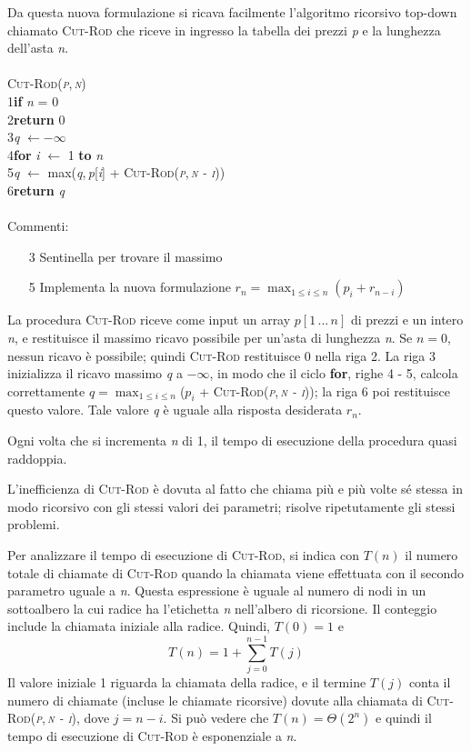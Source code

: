 \documentclass[10pt, a4paper]{report}
\newcommand\firsttab[1][0.5cm]{\hspace*{#1}}
\newcommand\secondtab[1][1cm]{\hspace*{#1}}
\begin{document}
Da questa nuova formulazione si ricava facilmente l'algoritmo ricorsivo top-down chiamato \textsc{Cut-Rod} che riceve in ingresso la tabella dei prezzi \textit{p} e la lunghezza dell'asta \textit{n}.\\\\
\textsc{Cut-Rod(\textit{p},\,\textit{n})}\\
1\firsttab\textbf{if} \textit{n} = 0\\
2\secondtab\textbf{return} 0\\
3\firsttab\textit{q} $\leftarrow -\infty$\\
4\firsttab\textbf{for} \textit{i} $\leftarrow$ 1 \textbf{to} \textit{n}\\
5\secondtab\textit{q} $\leftarrow$ max(\textit{q},\,\textit{p}[\textit{i}] + \textsc{Cut-Rod(\textit{p},\,\textit{n - i})})\\
6\firsttab\textbf{return} \textit{q}\\\\
Commenti:
\begin{enumerate}
\item[3]Sentinella per trovare il massimo
\item[5]Implementa la nuova formulazione $r_n = \max_{1 \leq i \leq n} (p_i + r_{n-i})$
\end{enumerate}
La procedura \textsc{Cut-Rod} riceve come input un array $p[1\,...\,n]$ di prezzi e un intero \textit{n}, e restituisce il massimo ricavo possibile per un'asta di lunghezza \textit{n}. Se $n = 0$, nessun ricavo è possibile; quindi \textsc{Cut-Rod} restituisce 0 nella riga 2. La riga 3 inizializza il ricavo massimo \textit{q} a $-\infty$, in modo che il ciclo \textbf{for}, righe 4 - 5, calcola correttamente $q = \max_{1 \leq i \leq n}$($p_i$ + \textsc{Cut-Rod(\textit{p},\,\textit{n - i})}); la riga 6 poi restituisce questo valore. Tale valore \textit{q} è uguale alla risposta desiderata $r_n$.

Ogni volta che si incrementa \textit{n} di 1, il tempo di esecuzione della procedura quasi raddoppia.

L'inefficienza di \textsc{Cut-Rod} è dovuta al fatto che chiama più e più volte sé stessa in modo ricorsivo con gli stessi valori dei parametri; risolve ripetutamente gli stessi problemi.

Per analizzare il tempo di esecuzione di \textsc{Cut-Rod}, si indica con $T(n)$ il numero totale di chiamate di \textsc{Cut-Rod} quando la chiamata viene effettuata con il secondo parametro uguale a \textit{n}. Questa espressione è uguale al numero di nodi in un sottoalbero la cui radice ha l'etichetta \textit{n} nell'albero di ricorsione. Il conteggio include la chiamata iniziale alla radice. Quindi, $T(0) = 1$ e
\begin{equation*}
T(n) = 1 + \sum_{j=0}^{n-1}T(j)
\end{equation*}
Il valore iniziale 1 riguarda la chiamata della radice, e il termine $T(j)$ conta il numero di chiamate (incluse le chiamate ricorsive) dovute alla chiamata di \textsc{Cut-Rod(\textit{p},\,\textit{n - i})}, dove $j = n - i$. Si può vedere che $T(n) = \Theta(2^n)$ e quindi il tempo di esecuzione di \textsc{Cut-Rod} è esponenziale a \textit{n}.
\end{document}
